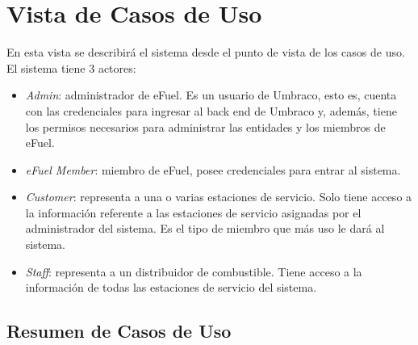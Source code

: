     \section{Vista de Casos de Uso} \label{vistaCasosDeUso}
    En esta vista se describirá el sistema desde el punto de vista de los casos de uso. El sistema tiene 3 actores:

    \begin{itemize}
        \item \emph{Admin}: administrador de eFuel. Es un usuario de Umbraco, esto es, cuenta con las credenciales para ingresar al back end de Umbraco y, además, tiene los permisos necesarios para administrar las entidades y los miembros de eFuel.
        \item \emph{eFuel Member}: miembro de eFuel, posee credenciales para entrar al sistema.
        \item \emph{Customer}: representa a una o varias estaciones de servicio. Solo tiene acceso a la información referente a las estaciones de servicio asignadas por el administrador del sistema. Es el tipo de miembro que más uso le dará al sistema.
        \item \emph{Staff}: representa a un distribuidor de combustible. Tiene acceso a la información de todas las estaciones de servicio del sistema.
    \end{itemize}

    \subsection{Resumen de Casos de Uso}

    \newcommand\rownumber{\stepcounter{magicrownumbers}\arabic{magicrownumbers}}

